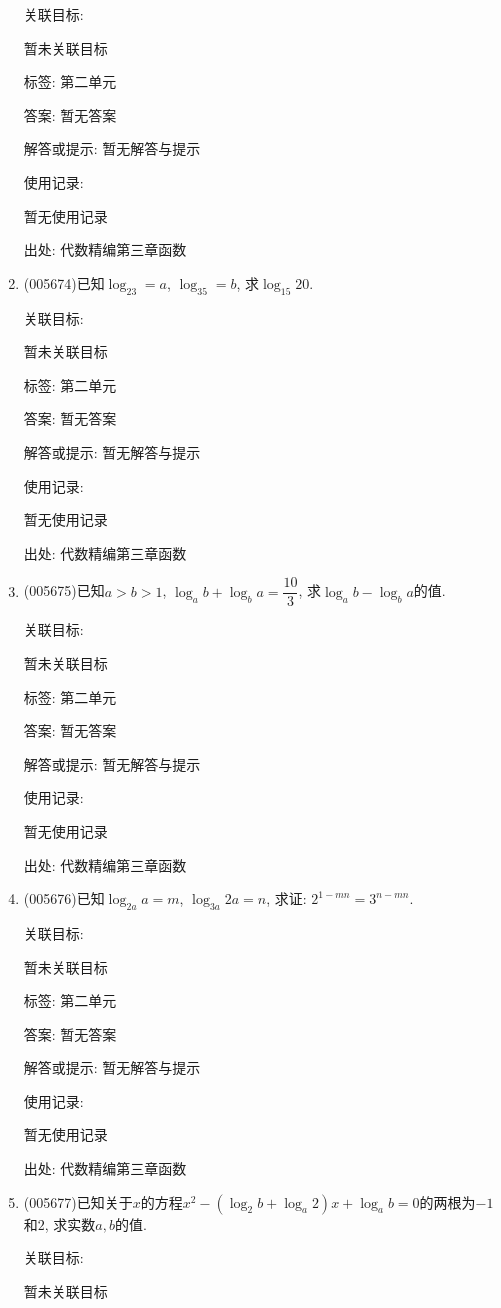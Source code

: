 \documentclass[10pt,a4paper]{article}
\begin{document}
\begin{enumerate}[1.]
关联目标:

暂未关联目标



标签: 第二单元

答案: 暂无答案

解答或提示: 暂无解答与提示

使用记录:

暂无使用记录


出处: 代数精编第三章函数
\item { (005674)}已知$\log_23=a$, $\log_35=b$, 求$\log_{15}20$.


关联目标:

暂未关联目标



标签: 第二单元

答案: 暂无答案

解答或提示: 暂无解答与提示

使用记录:

暂无使用记录


出处: 代数精编第三章函数
\item { (005675)}已知$a>b>1$, $\log_ab+\log_ba=\dfrac{10}3$, 求$\log_ab-\log_ba$的值.


关联目标:

暂未关联目标



标签: 第二单元

答案: 暂无答案

解答或提示: 暂无解答与提示

使用记录:

暂无使用记录


出处: 代数精编第三章函数
\item { (005676)}已知$\log_{2a}a=m$, $\log_{3a}2a=n$, 求证: $2^{1-mn}=3^{n-mn}$.


关联目标:

暂未关联目标



标签: 第二单元

答案: 暂无答案

解答或提示: 暂无解答与提示

使用记录:

暂无使用记录


出处: 代数精编第三章函数
\item { (005677)}已知关于$x$的方程$x^2-(\log_2b+\log_a2)x+\log_ab=0$的两根为$-1$和$2$, 求实数$a,b$的值.


关联目标:

暂未关联目标




\end{enumerate}
\end{document}
